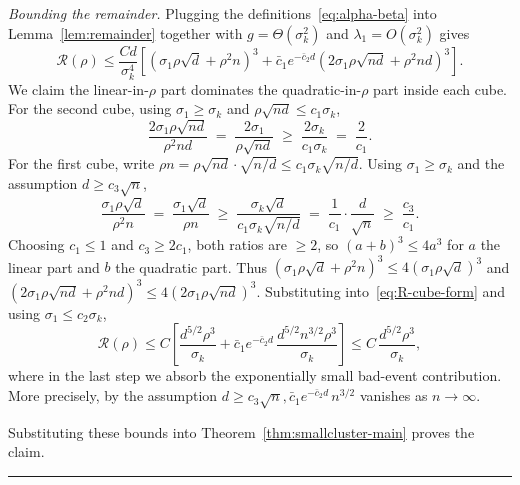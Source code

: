 \documentclass{article}
\newcommand{\Rcal}{\mathcal{R}}
\newcommand{\BlackBox}{\rule{1.5ex}{1.5ex}}  %
\newenvironment{proof}{\par\noindent{\bf Proof\ }}{\hfill\BlackBox\par\medskip}
\newcommand{\rbr}[1]{\left(#1\right)}
\newcommand{\sbr}[1]{\left[#1\right]}
\begin{document}
\begin{proof}
\emph{Bounding the remainder.} Plugging the definitions~\eqref{eq:alpha-beta} into Lemma~\ref{lem:remainder} together with $g=\Theta(\sigma_k^2)$ and $\lambda_1=O(\sigma_k^2)$ gives
\begin{equation}\label{eq:R-cube-form}
    \Rcal(\rho) \le \frac{Cd}{\sigma_k^4}\sbr{\rbr{\sigma_1\rho\sqrt d + \rho^2 n}^3 + \bar c_1 e^{-\bar c_2 d}\rbr{2\sigma_1\rho\sqrt{nd}+\rho^2 nd}^3}.
\end{equation}
We claim the linear-in-$\rho$ part dominates the quadratic-in-$\rho$ part inside each cube. For the second cube, using $\sigma_1\ge\sigma_k$ and $\rho\sqrt{nd}\le c_1\sigma_k$,
\begin{equation*}
    \frac{2\sigma_1\rho\sqrt{nd}}{\rho^2 nd} \;=\; \frac{2\sigma_1}{\rho\sqrt{nd}} \;\ge\; \frac{2\sigma_k}{c_1\sigma_k} \;=\; \frac{2}{c_1}.
\end{equation*}
For the first cube, write $\rho n = \rho\sqrt{nd}\cdot\sqrt{n/d}\le c_1\sigma_k\sqrt{n/d}$. Using $\sigma_1\ge\sigma_k$ and the assumption $d\ge c_3\sqrt n$,
\begin{equation*}
    \frac{\sigma_1\rho\sqrt d}{\rho^2 n} \;=\; \frac{\sigma_1\sqrt d}{\rho n} \;\ge\; \frac{\sigma_k\sqrt d}{c_1\sigma_k\sqrt{n/d}} \;=\; \frac{1}{c_1}\cdot\frac{d}{\sqrt n} \;\ge\; \frac{c_3}{c_1}.
\end{equation*}
Choosing $c_1\le 1$ and $c_3\ge 2c_1$, both ratios are $\ge 2$, so $(a+b)^3\le 4 a^3$ for $a$ the linear part and $b$ the quadratic part. Thus $(\sigma_1\rho\sqrt d+\rho^2 n)^3\le 4(\sigma_1\rho\sqrt d)^3$ and $(2\sigma_1\rho\sqrt{nd}+\rho^2 nd)^3\le 4(2\sigma_1\rho\sqrt{nd})^3$. Substituting into~\eqref{eq:R-cube-form} and using $\sigma_1\le c_2\sigma_k$,
\begin{equation*}
    \Rcal(\rho) \le C\sbr{\frac{d^{5/2}\rho^3}{\sigma_k} + \bar c_1 e^{-\bar c_2 d}\,\frac{d^{5/2} n^{3/2}\rho^3}{\sigma_k}} \le C\,\frac{d^{5/2}\rho^3}{\sigma_k},
\end{equation*}
where in the last step we absorb the exponentially small bad-event contribution. More precisely, by the assumption $d\ge c_3 \sqrt{n}, \bar c_1 e^{-\bar c_2 d}\,n^{3/2}$ vanishes as $n\rightarrow \infty$.

Substituting these bounds into Theorem~\ref{thm:smallcluster-main} proves the claim.
\end{proof}
\end{document}
